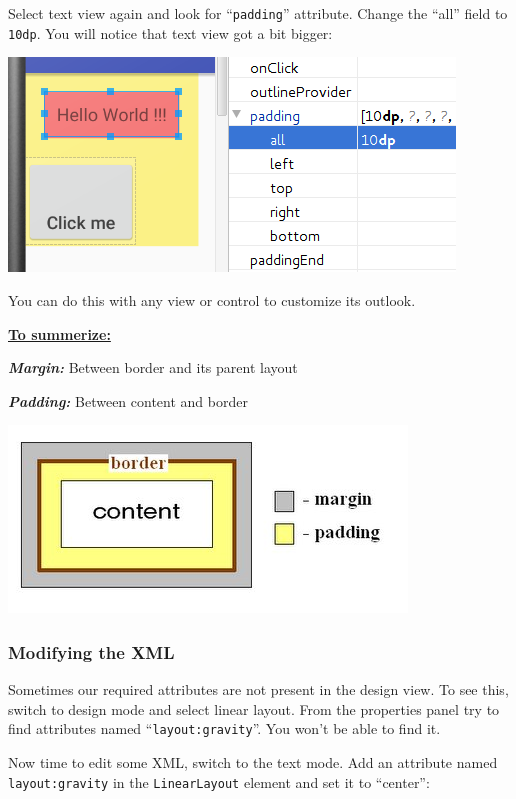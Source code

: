 Select text view again and look for ``\texttt{padding}'' attribute. Change the ``all'' field to \texttt{10dp}. You will notice that text view got a bit bigger:

\begin{center}
	\includegraphics[scale=0.4]{chapters/ch03/images/16_padding}
\end{center}

You can do this with any view or control to customize its outlook.

\underline{\textbf{To summerize:}}

\textit{\textbf{Margin:}} Between border and its parent layout

\textit{\textbf{Padding:}} Between content and border

\begin{center}
	\includegraphics[scale=0.3]{chapters/ch03/images/17_mar_pad}
\end{center}

\subsubsection{Modifying the XML}
Sometimes our required attributes are not present in the design view. To see this, switch to design mode and select linear layout. From the properties panel try to find attributes named ``\texttt{layout:gravity}''. You won't be able to find it. 

Now time to edit some XML, switch to the text mode. Add an attribute named \texttt{layout:gravity} in the \texttt{LinearLayout} element and set it to ``center'':

